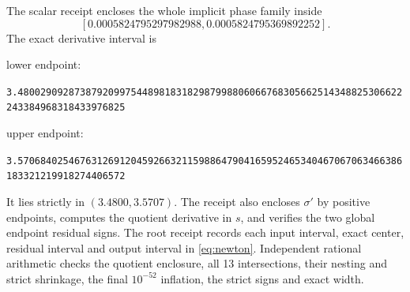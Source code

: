 The scalar receipt encloses the whole implicit phase family inside
\[
 [0.0005824795297982988,0.0005824795369892252].
\]
The exact derivative interval is
\begin{center}\footnotesize
lower endpoint:\par\smallskip
\texttt{3.48002909287387920997544898183182987998806066768305662514348825306622243384968318433976825}
\par\smallskip
upper endpoint:\par\smallskip
\texttt{3.57068402546763126912045926632115988647904165952465340467067063466386183321219918274406572}
\end{center}
It lies strictly in \((3.4800,3.5707)\).
The receipt also encloses \(\sigma'\) by positive endpoints, computes
the quotient derivative in \(s\), and verifies the two global endpoint
residual signs. The root receipt records each input interval, exact
center, residual interval and output interval in \eqref{eq:newton}.
Independent rational arithmetic checks the quotient enclosure, all
13 intersections, their nesting and strict shrinkage, the final
\(10^{-52}\) inflation, the strict signs and exact width.

